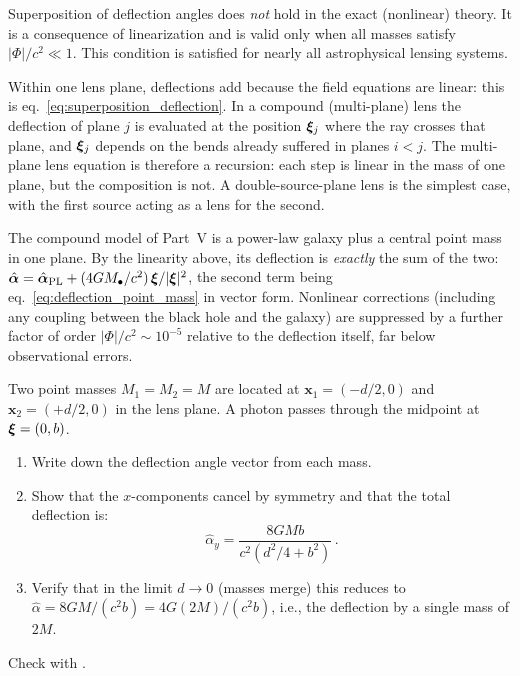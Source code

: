 \begin{remark}
Superposition of deflection angles does \emph{not} hold in the
exact (nonlinear) theory.  It is a consequence of linearization and is
valid only when all masses satisfy $|\Phi|/c^2 \ll 1$.  This
condition is satisfied for nearly all astrophysical lensing
systems.
\end{remark}

\begin{bridge}
Within one lens plane, deflections add because the field equations are
linear: this is eq.~\eqref{eq:superposition_deflection}.  In a compound
(multi-plane) lens the deflection of plane $j$ is evaluated at the position
$\boldsymbol{\xi}_j$ where the ray crosses that plane, and $\boldsymbol{\xi}_j$ depends on the
bends already suffered in planes $i < j$.  The multi-plane lens equation is
therefore a recursion: each step is linear in the mass of one plane, but the
composition is not.  A double-source-plane lens is the simplest case, with
the first source acting as a lens for the second.
\end{bridge}

\begin{bridge}
The compound model of Part~V is a power-law galaxy plus a central point
mass in one plane.  By the linearity above, its deflection is \emph{exactly}
the sum of the two:
$\hat{\boldsymbol\alpha} = \hat{\boldsymbol\alpha}_{\mathrm{PL}}
+ (4GM_\bullet/c^2)\,\boldsymbol{\xi}/|\boldsymbol{\xi}|^2$, the second term being
eq.~\eqref{eq:deflection_point_mass} in vector form.  Nonlinear
corrections (including any coupling between the black hole and the galaxy)
are suppressed by a further factor of order $|\Phi|/c^2 \sim 10^{-5}$
relative to the deflection itself, far below observational errors.
\end{bridge}


\begin{exercise}
\label{ex:superposition}
Two point masses $M_1 = M_2 = M$ are located at
$\mathbf{x}_1 = (-d/2, 0)$ and $\mathbf{x}_2 = (+d/2, 0)$ in the
lens plane.  A photon passes through the midpoint at
$\boldsymbol{\xi} = (0, b)$.
\begin{enumerate}[label=(\alph*)]
    \item Write down the deflection angle vector from each mass.
    \item Show that the $x$-components cancel by symmetry and that the
          total deflection is:
          \[
              \hat{\alpha}_y = \frac{8GMb}{c^2(d^2/4 + b^2)} \,.
          \]
    \item Verify that in the limit $d \to 0$ (masses merge) this
          reduces to $\hat{\alpha} = 8GM/(c^2 b) = 4G(2M)/(c^2 b)$,
          i.e., the deflection by a single mass of $2M$.
\end{enumerate}
Check with
.
\end{exercise}


